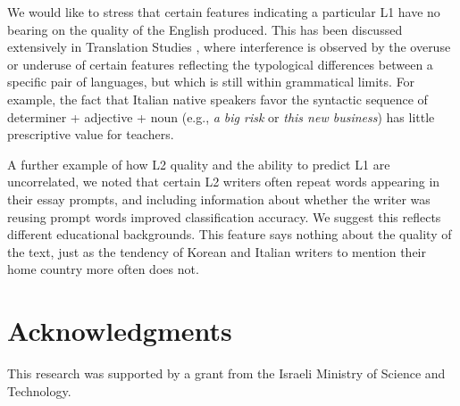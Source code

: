 \documentclass[11pt,letterpaper]{article}
\newcommand{\citep}[1]{\cite{#1}}
\newcommand{\textnl}{\textit}
\begin{document}
We would like to stress that certain features indicating a particular L1 have no bearing on the quality of the English produced. This has been discussed extensively in Translation Studies \citep{Toury:1995}, where interference is observed by the overuse or underuse of certain features reflecting the typological differences between a specific pair of languages, but which is still within grammatical limits. For example, the fact that Italian native speakers favor the syntactic sequence of determiner + adjective + noun (e.g., \textnl{a big risk} or \textnl{this new business}) has little prescriptive value for teachers.

A further example of how L2 quality and the ability to predict L1 are uncorrelated, we noted that certain L2 writers often repeat words appearing in their essay prompts, and including information about whether the writer was reusing prompt words improved classification accuracy. We suggest this reflects different educational backgrounds. This feature says nothing about the quality of the text, just as the tendency of Korean and Italian writers to mention their home country more often does not.


\section*{Acknowledgments}
This research was supported by a grant from the Israeli Ministry of
Science and Technology.


%

\end{document}
